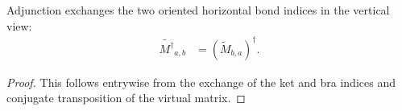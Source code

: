 \begin{lemma}
    \label{lem:vertical_tensor_adjoint_reflection}
    \leanok
    Adjunction exchanges the two oriented horizontal bond indices in the
    vertical view:
    \begin{align}
        \widetilde{M^\dagger}_{a,b}
         & =(\widetilde M_{b,a})^\dagger.
        \label{eq:mpdo_adjoint_reflection}
    \end{align}
\end{lemma}

\begin{proof}
    \leanok
    This follows entrywise from the exchange of the ket and bra indices and
    conjugate transposition of the virtual matrix.
\end{proof}

